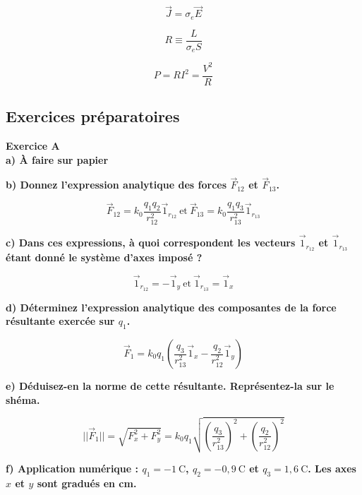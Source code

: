 \documentclass	[11pt, a4paper, openany]{book}
\newcommand{\E}{\vec E}
\newcommand{\exerc}[2]{\textbf{\Large Exercice #1\normalsize \\#2}}
\newcommand{\comment}[1]{}
\begin{document}
	$$ \vec J = \sigma_e \E $$
	
	
	$$ R \equiv \dfrac{L}{\sigma_e S} $$
	
	
	$$ P = R I^2 = \dfrac{V^2}{R}$$
	\newpage
	\subsection{Exercices préparatoires}
\exerc{A}{a) À faire sur papier}
	
	\textbf{b) Donnez l'expression analytique des forces $\vec F_{12}$ et $\vec F_{13}$.}
	
	$$\vec F_{12} = k_0 \dfrac{q_1q_2}{r_{12}^2} \vec 1_{r_{12}}\ \text{et}\ \vec F_{13} = k_0 \dfrac{q_1q_3}{r_{13}^2} \vec 1_{r_{13}}$$
	
	\textbf{c) Dans ces expressions, à quoi correspondent les vecteurs $\vec 1_{r_{12}}$ et $\vec 1_{r_{13}}$ étant donné le système d'axes imposé ?}
	
	$$\vec 1_{r_{12}} = - \vec 1_y\ \text{et}\ \vec 1_{r_{13}} = \vec 1_x$$
	
	\textbf{d) Déterminez l'expression analytique des composantes de la force résultante exercée sur $q_1$.}
	
	$$\vec F_1 = k_0 q_1 \left( \dfrac{q_3}{r_{13}^2} \vec 1_x - \dfrac{q_2}{r_{12}^2} \vec 1_y \right)$$
	
	\textbf{e) Déduisez-en la norme de cette résultante. Représentez-la sur le shéma.}
	
	$$||\vec F_1|| = \sqrt{F_x^2 + F_y^2} = k_0 q_1 \sqrt{ \left( \dfrac{q_3}{r_{13}^2} \right)^2 + \left(  \dfrac{q_2}{r_{12}^2} \right)^2 }$$
	
	\textbf{f) Application numérique : $q_1 = -1\ \text{C}$, $q_2 = -0,9\ \text{C}$ et $q_3 = 1,6\ \text{C}$. Les axes $x$ et $y$ sont gradués en cm.}

\comment{\vspace{0,5cm}

\exerc{B}{a) À faire sur papier}
	
	\textbf{b) Donnez l'expression analytique des ces champs et exprimez ces vecteurs dans le système d'axe $Oxy$.}
	
	\textbf{c) Déterminez l'expression analytique des composantes du champ résultant $\E (\vec x_1)$ apparaissant à l'endroit où se trouve $q_1$.}
	
	\textbf{d) Déduisez-en la norme de ce champ.}
	
	\textbf{e) Déduisez de cette valeur la norme de la force résultante exercée sur $q_1$. Comparez avec l'exercice A.}
	
	\textbf{f) Application numérique : $q_1 = -1\ \text{C}$, $q_2 = -0,9\ \text{C}$ et $q_3 = 1,6\ \text{C}$. Les axes $x$ et $y$ sont gradués en cm.}}
\end{document}
